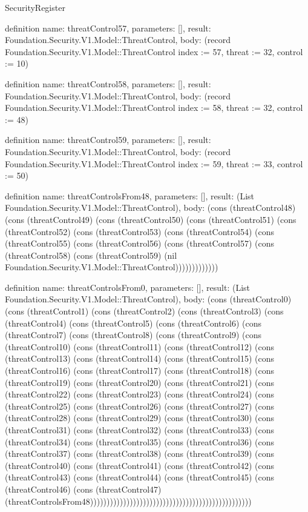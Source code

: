 \begin{lexlean}{SecurityRegister}
\begin{semanticmodule}
definition{
  name: threatControl57,
  parameters: [],
  result: Foundation.Security.V1.Model::ThreatControl,
  body: (record Foundation.Security.V1.Model::ThreatControl {index := 57, threat := 32, control := 10})
}

definition{
  name: threatControl58,
  parameters: [],
  result: Foundation.Security.V1.Model::ThreatControl,
  body: (record Foundation.Security.V1.Model::ThreatControl {index := 58, threat := 32, control := 48})
}

definition{
  name: threatControl59,
  parameters: [],
  result: Foundation.Security.V1.Model::ThreatControl,
  body: (record Foundation.Security.V1.Model::ThreatControl {index := 59, threat := 33, control := 50})
}

definition{
  name: threatControlsFrom48,
  parameters: [],
  result: (List Foundation.Security.V1.Model::ThreatControl),
  body: (cons (threatControl48) (cons (threatControl49) (cons (threatControl50) (cons (threatControl51) (cons (threatControl52) (cons (threatControl53) (cons (threatControl54) (cons (threatControl55) (cons (threatControl56) (cons (threatControl57) (cons (threatControl58) (cons (threatControl59) (nil Foundation.Security.V1.Model::ThreatControl)))))))))))))
}

definition{
  name: threatControlsFrom0,
  parameters: [],
  result: (List Foundation.Security.V1.Model::ThreatControl),
  body: (cons (threatControl0) (cons (threatControl1) (cons (threatControl2) (cons (threatControl3) (cons (threatControl4) (cons (threatControl5) (cons (threatControl6) (cons (threatControl7) (cons (threatControl8) (cons (threatControl9) (cons (threatControl10) (cons (threatControl11) (cons (threatControl12) (cons (threatControl13) (cons (threatControl14) (cons (threatControl15) (cons (threatControl16) (cons (threatControl17) (cons (threatControl18) (cons (threatControl19) (cons (threatControl20) (cons (threatControl21) (cons (threatControl22) (cons (threatControl23) (cons (threatControl24) (cons (threatControl25) (cons (threatControl26) (cons (threatControl27) (cons (threatControl28) (cons (threatControl29) (cons (threatControl30) (cons (threatControl31) (cons (threatControl32) (cons (threatControl33) (cons (threatControl34) (cons (threatControl35) (cons (threatControl36) (cons (threatControl37) (cons (threatControl38) (cons (threatControl39) (cons (threatControl40) (cons (threatControl41) (cons (threatControl42) (cons (threatControl43) (cons (threatControl44) (cons (threatControl45) (cons (threatControl46) (cons (threatControl47) (threatControlsFrom48)))))))))))))))))))))))))))))))))))))))))))))))))
}


\end{semanticmodule}
\end{lexlean}
